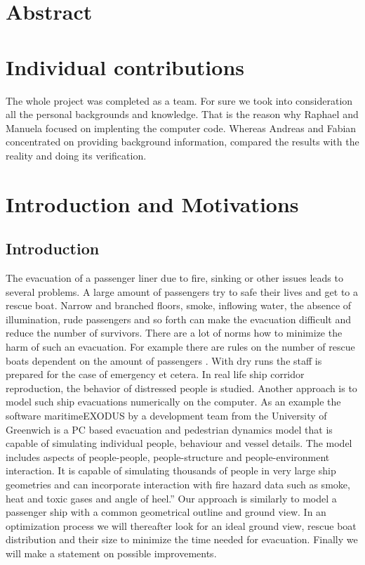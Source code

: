 \documentclass[11pt]{article}
\begin{document}

\tableofcontents

\newpage




\section{Abstract}

\section{Individual contributions}
The whole project was completed as a team. For sure we took into consideration all the personal backgrounds and  knowledge. That is the reason why Raphael and Manuela focused on implenting the computer code. Whereas Andreas and Fabian concentrated on providing background information, compared the results with the reality and doing its verification.
\section{Introduction and Motivations}
\subsection{Introduction}
The evacuation of a passenger liner due to fire, sinking or other issues leads to several problems. A large amount of passengers try to safe their lives and get to a rescue boat. Narrow and branched floors, smoke, inflowing water, the absence of illumination, rude passengers and so forth can make the evacuation difficult and reduce the number of survivors.
There are a lot of norms how to minimize the harm of such an evacuation. For example there are rules on the number of rescue boats dependent on the amount of passengers \cite{SOLAS}. With dry runs the staff is prepared for the case of emergency et cetera. In real life ship corridor reproduction, the behavior of distressed people is studied.
Another approach is to model such ship evacuations numerically on the computer. As an example the software maritimeEXODUS by a development team from the University of Greenwich is a PC based evacuation and pedestrian dynamics model that is capable of simulating individual people, behaviour and vessel details. The model includes aspects of people-people, people-structure and people-environment interaction. It is capable of simulating thousands of people in very large ship geometries and can incorporate interaction with fire hazard data such as smoke, heat and toxic gases and angle of heel.” \cite{EXODUS}
Our approach is similarly to model a passenger ship with a common geometrical outline and ground view. In an optimization process we will thereafter look for an ideal ground view, rescue boat distribution and their size to minimize the time needed for evacuation. Finally we will make a statement on possible improvements.
\newpage
\end{document}
